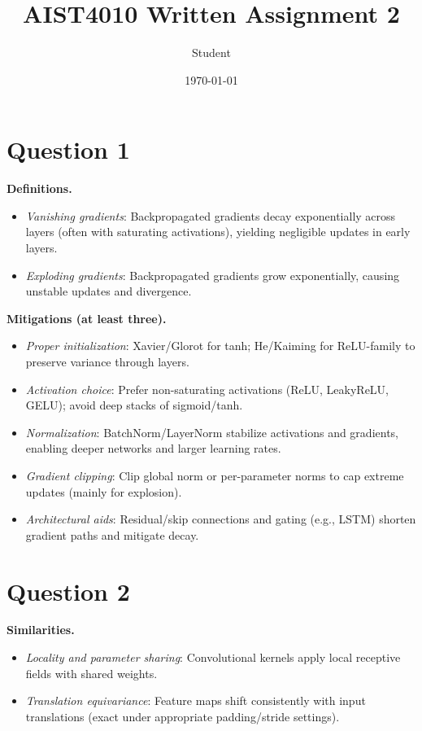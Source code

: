 \documentclass{article}
\title{AIST4010 Written Assignment 2}
\author{Student}
\date{\today}
\begin{document}
\maketitle

\section{Question 1}
\textbf{Definitions.}
\begin{itemize}[leftmargin=*]
    \item \emph{Vanishing gradients}: Backpropagated gradients decay exponentially across layers (often with saturating activations), yielding negligible updates in early layers.
    \item \emph{Exploding gradients}: Backpropagated gradients grow exponentially, causing unstable updates and divergence.
\end{itemize}

\textbf{Mitigations (at least three).}
\begin{itemize}[leftmargin=*]
    \item \emph{Proper initialization}: Xavier/Glorot for tanh; He/Kaiming for ReLU-family to preserve variance through layers.
    \item \emph{Activation choice}: Prefer non-saturating activations (ReLU, LeakyReLU, GELU); avoid deep stacks of sigmoid/tanh.
    \item \emph{Normalization}: BatchNorm/LayerNorm stabilize activations and gradients, enabling deeper networks and larger learning rates.
    \item \emph{Gradient clipping}: Clip global norm or per-parameter norms to cap extreme updates (mainly for explosion).
    \item \emph{Architectural aids}: Residual/skip connections and gating (e.g., LSTM) shorten gradient paths and mitigate decay.
\end{itemize}


\section{Question 2}
\textbf{Similarities.}
\begin{itemize}[leftmargin=*]
  \item \emph{Locality and parameter sharing}: Convolutional kernels apply local receptive fields with shared weights.
  \item \emph{Translation equivariance}: Feature maps shift consistently with input translations (exact under appropriate padding/stride settings).
\end{itemize}
\end{document}
